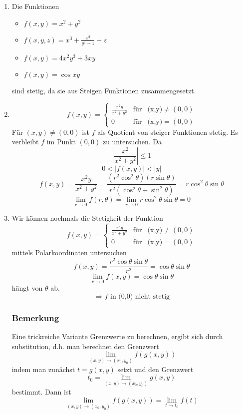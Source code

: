 \begin{enumerate}
\item Die Funktionen 
\begin{itemize}
\item $f(x,y)=x^2+y^2$
\item $f(x,y,z)=x^3+\frac{x^2}{y^2+1}+z$
\item $f(x,y)=4x^2 y^3+3xy$
\item $f(x,y)=\cos xy$
\end{itemize}
sind stetig, da sie aus Steigen Funktionen zusammengesetzt.

\item \[f(x,y) = \left\{ {\begin{array}{*{20}{c}}
{\frac{{{x^2}y}}{{{x^2} + {y^2}}}}&{{\text{für}}}&{{\text{(x,y)}}\not  = (0,0)}\\
0&{{\text{für}}}&{{\text{(x,y)}}= (0,0)}
\end{array}} \right.\]
Für $(x,y)\not=(0,0)$ ist $f$ als Quotient von steiger Funktionen stetig. Es verbleibt $f$ im Punkt $(0,0)$ zu untersuchen. Da \[\left| {\frac{{{x^2}}}{{{x^2} + {y^2}}}} \right| \le 1\] $$ 0<\left| f(x,y)\right| <\left| y\right|$$ \[f(x,y) = \frac{{{x^2}y}}{{{x^2} + {y^2}}} = \frac{{\left( {{r^2}{{\cos }^2}\theta } \right)\left( {r\sin \theta } \right)}}{{{r^2}\left( {{{\cos }^2}\theta  + {{\sin }^2}\theta } \right)}} = r{\cos ^2}\theta \sin \theta \] 
\[\mathop {\lim }\limits_{r \to 0} f(r,\theta ) = \mathop {\lim }\limits_{r \to 0} r{\cos ^2}\theta \sin \theta  = 0\]
\item Wir können nochmals die Stetigkeit der Funktion 
\[f(x,y) = \left\{ {\begin{array}{*{20}{c}}
{\frac{{{x^2}y}}{{{x^2} + {y^2}}}}&{{\text{für}}}&{{\text{(x,y)}}\not  = (0,0)}\\
0&{{\text{für}}}&{{\text{(x,y)}}= (0,0)}
\end{array}} \right.\] mittels Polarkoordinaten untersuchen $$f(x,y)=\frac{r^2\cos\theta\sin\theta}{r^2}=\cos\theta\sin\theta$$ \[\mathop {\lim }\limits_{r \to 0} f(x,y) = \cos \theta \sin \theta \] hängt von $\theta$ ab. $$\Rightarrow f\text{ in (0,0) nicht stetig}$$

\subsubsection*{Bemerkung}
Eine trickreiche Variante Grenzwerte zu berechnen, ergibt sich durch substitution, d.h. man berechnet den Grenzwert \[\mathop {\lim }\limits_{(x,y) \to ({x_0},{y_0})} f\left( {g(x,y)} \right)\] indem man zunächst $t=g(x,y)$ setzt und den Grenzwert \[{t_0} = \mathop {\lim }\limits_{(x,y) \to ({x_0},{y_0})} g(x,y)\] bestimmt. Dann ist \[\mathop {\lim }\limits_{(x,y) \to ({x_0},{y_0})} f\left( {g(x,y)} \right) = \mathop {\lim }\limits_{t \to {t_0}} f(t)\] 
\end{enumerate}


